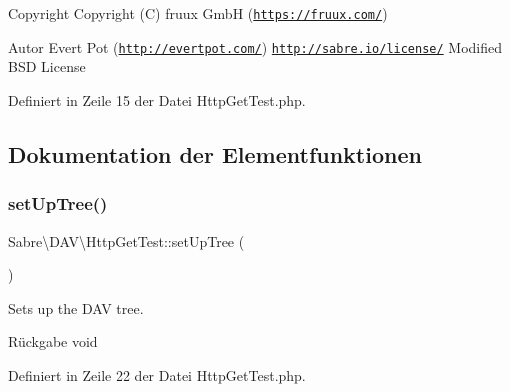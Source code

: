 \begin{DoxyCopyright}{Copyright}
Copyright (C) fruux GmbH (\href{https://fruux.com/}{\tt https\+://fruux.\+com/}) 
\end{DoxyCopyright}
\begin{DoxyAuthor}{Autor}
Evert Pot (\href{http://evertpot.com/}{\tt http\+://evertpot.\+com/})  \href{http://sabre.io/license/}{\tt http\+://sabre.\+io/license/} Modified B\+SD License 
\end{DoxyAuthor}


Definiert in Zeile 15 der Datei Http\+Get\+Test.\+php.



\subsection{Dokumentation der Elementfunktionen}
\mbox{\label{class_sabre_1_1_d_a_v_1_1_http_get_test_a8d42be6fbd63efe9669dfd28c6df1a35}} 
\subsubsection{\texorpdfstring{set\+Up\+Tree()}{setUpTree()}}
{\footnotesize\ttfamily Sabre\textbackslash{}\+D\+A\+V\textbackslash{}\+Http\+Get\+Test\+::set\+Up\+Tree (\begin{DoxyParamCaption}{ }\end{DoxyParamCaption})}

Sets up the D\+AV tree.

\begin{DoxyReturn}{Rückgabe}
void 
\end{DoxyReturn}


Definiert in Zeile 22 der Datei Http\+Get\+Test.\+php.

\mbox{\label{class_sabre_1_1_d_a_v_1_1_http_get_test_af28a2f3127a7f53355767b23d7f0c604}} 
